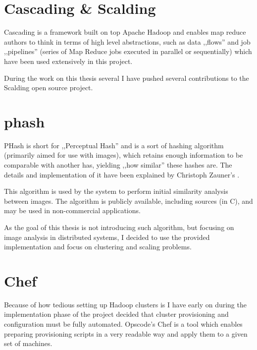 \section{Cascading \& Scalding}
\label{sec:chef}
Cascading is a framework built on top Apache Hadoop and enables map reduce authors to think in terms of high level abstractions, such as data ,,flows'' 
and job ,,pipelines'' (series of Map Reduce jobs executed in parallel or sequentially) which have been used extensively in this project.

During the work on this thesis several I have pushed several contributions to the Scalding open source project.


\section{phash}
\label{sec:phash}
PHash is short for ,,Perceptual Hash'' and is a sort of hashing algorithm (primarily aimed for use with images), which retains enough information to be 
comparable with another has, yielding ,,how similar'' these hashes are. The details and implementation of it have been explained by Christoph Zauner's \cite{phash}.

This algorithm is used by the system to perform initial similarity analysis between images. 
The algorithm is publicly available, including sources (in C), and may be used in non-commercial applications.

As the goal of this thesis is not introducing such algorithm, but focusing on image analysis in distributed systems,
I decided to use the provided implementation and focus on clustering and scaling problems.

\section{Chef}
\label{sec:chef}
Because of how tedious setting up Hadoop clusters is I have early on during the implementation phase of the project decided that cluster 
provisioning and configuration must be fully automated. Opscode's Chef is a tool which enables preparing provisioning scripts in a very readable
way and apply them to a given set of machines.

